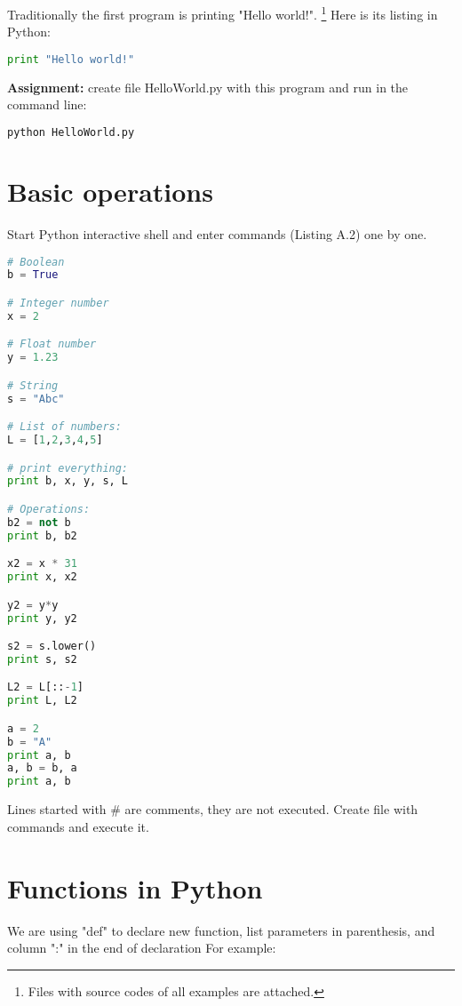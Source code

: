 Traditionally the first program is printing "Hello world!".
\footnote{Files with source codes of all examples are attached.}
Here is its listing in Python:

\begin{lstlisting}[style=codelst2, language=Python,caption={Python: Hello World!}]
print "Hello world!"
\end{lstlisting}

\bigskip
\begin{tcolorbox}
\textbf{Assignment:} create file HelloWorld.py with this program
and run in the command line:
\begin{lstlisting}[language=bash,frame=single,caption={Python: run HelloWorld.py}]
python HelloWorld.py
\end{lstlisting}
\end{tcolorbox}

\section{Basic operations}

Start Python interactive shell and enter commands (Listing A.2) one by one.

\begin{lstlisting}[style=codelst,language=Python,caption={Basic types}]
# Boolean
b = True

# Integer number
x = 2

# Float number
y = 1.23

# String
s = "Abc"

# List of numbers:
L = [1,2,3,4,5]

# print everything:
print b, x, y, s, L

# Operations:
b2 = not b
print b, b2

x2 = x * 31
print x, x2

y2 = y*y
print y, y2

s2 = s.lower()
print s, s2

L2 = L[::-1]
print L, L2

a = 2
b = "A"
print a, b
a, b = b, a
print a, b
\end{lstlisting}
Lines started with \# are comments, they are not executed.
Create file with commands and execute it. 

\section{Functions in Python}

We are using "def" to declare new function, list parameters in
parenthesis, and column ":" in the end of declaration
For example:

